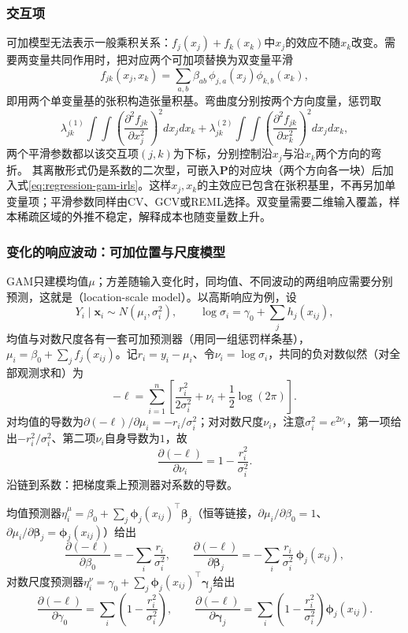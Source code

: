 \subsubsection{交互项}
\label{sec:regression-gam-interactions}

可加模型无法表示一般乘积关系：$f_j(x_j)+f_k(x_k)$中$x_j$的效应不随$x_k$改变。需要两变量共同作用时，把对应两个可加项替换为双变量平滑
\[
  f_{jk}(x_j,x_k)=\sum_{a,b}\beta_{ab}\,\phi_{j,a}(x_j)\phi_{k,b}(x_k),
\]
即用两个单变量基的张积构造张量积基。弯曲度分别按两个方向度量，惩罚取
\[
  \lambda_{jk}^{(1)}\!\int\!\!\int\!\left(\frac{\partial^2 f_{jk}}{\partial x_j^2}\right)^2 dx_j dx_k
  +\lambda_{jk}^{(2)}\!\int\!\!\int\!\left(\frac{\partial^2 f_{jk}}{\partial x_k^2}\right)^2 dx_j dx_k,
\]
两个平滑参数都以该交互项$(j,k)$为下标，分别控制沿$x_j$与沿$x_k$两个方向的弯折。
其离散形式仍是系数的二次型，可嵌入$\bm{P}$的对应块（两个方向各一块）后加入式\eqref{eq:regression-gam-irls}。这样$x_j,x_k$的主效应已包含在张积基里，不再另加单变量项；平滑参数同样由CV、GCV或REML选择。双变量需要二维输入覆盖，样本稀疏区域的外推不稳定，解释成本也随变量数上升。

\subsubsection{变化的响应波动：可加位置与尺度模型}
\label{sec:regression-distributional}

GAM只建模均值$\mu$；方差随输入变化时，同均值、不同波动的两组响应需要分别预测，这就是（location-scale model）。以高斯响应为例，设
\[
  Y_i\mid\bm{x}_i\sim N(\mu_i,\sigma_i^2),\qquad
  \log\sigma_i=\gamma_0+\sum_j h_j(x_{ij}),
\]
均值与对数尺度各有一套可加预测器（用同一组惩罚样条基），$\mu_i=\beta_0+\sum_j f_j(x_{ij})$。记$r_i=y_i-\mu_i$、令$\nu_i=\log\sigma_i$，共同的负对数似然（对全部观测求和）为
\[
  -\ell=\sum_{i=1}^n\left[
    \frac{r_i^2}{2\sigma_i^2}
    +\nu_i+\frac12\log(2\pi)\right].
\]
对均值的导数为$\partial(-\ell)/\partial\mu_i=-r_i/\sigma_i^2$；对对数尺度$\nu_i$，注意$\sigma_i^2=e^{2\nu_i}$，第一项给出$-r_i^2/\sigma_i^2$、第二项$\nu_i$自身导数为$1$，故
\[
  \frac{\partial(-\ell)}{\partial\nu_i}
  =1-\frac{r_i^2}{\sigma_i^2}.
\]
沿链到系数：把梯度乘上预测器对系数的导数。

均值预测器$\eta^\mu_i=\beta_0+\sum_j\bm{\phi}_j(x_{ij})^{\top}\bm{\beta}_j$（恒等链接，$\partial\mu_i/\partial\beta_0=1$、$\partial\mu_i/\partial\bm{\beta}_j=\bm{\phi}_j(x_{ij})$）给出
\[
  \frac{\partial(-\ell)}{\partial\beta_0}
  =-\sum_i\frac{r_i}{\sigma_i^2},
  \qquad
  \frac{\partial(-\ell)}{\partial\bm{\beta}_j}
  =-\sum_i\frac{r_i}{\sigma_i^2}\,\bm{\phi}_j(x_{ij}),
\]
对数尺度预测器$\eta^\nu_i=\gamma_0+\sum_j\bm{\phi}_j(x_{ij})^{\top}\bm{\gamma}_j$给出
\[
  \frac{\partial(-\ell)}{\partial\gamma_0}
  =\sum_i\left(1-\frac{r_i^2}{\sigma_i^2}\right),
  \qquad
  \frac{\partial(-\ell)}{\partial\bm{\gamma}_j}
  =\sum_i\left(1-\frac{r_i^2}{\sigma_i^2}\right)\bm{\phi}_j(x_{ij}).
\]

